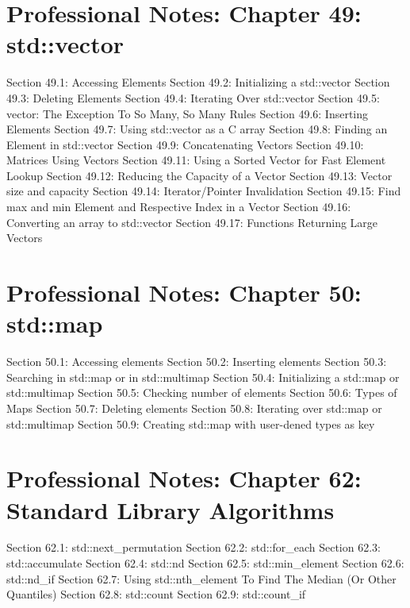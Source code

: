 \hypertarget{professional-notes-chapter-49-stdvector}{%
\section{Professional Notes: Chapter 49:
std::vector}\label{professional-notes-chapter-49-stdvector}}

Section 49.1: Accessing Elements Section 49.2: Initializing a
std::vector Section 49.3: Deleting Elements Section 49.4: Iterating Over
std::vector Section 49.5: vector: The Exception To So Many, So Many
Rules Section 49.6: Inserting Elements Section 49.7: Using std::vector
as a C array Section 49.8: Finding an Element in std::vector Section
49.9: Concatenating Vectors Section 49.10: Matrices Using Vectors
Section 49.11: Using a Sorted Vector for Fast Element Lookup Section
49.12: Reducing the Capacity of a Vector Section 49.13: Vector size and
capacity Section 49.14: Iterator/Pointer Invalidation Section 49.15:
Find max and min Element and Respective Index in a Vector Section 49.16:
Converting an array to std::vector Section 49.17: Functions Returning
Large Vectors

\hypertarget{professional-notes-chapter-50-stdmap}{%
\section{Professional Notes: Chapter 50:
std::map}\label{professional-notes-chapter-50-stdmap}}

Section 50.1: Accessing elements Section 50.2: Inserting elements
Section 50.3: Searching in std::map or in std::multimap Section 50.4:
Initializing a std::map or std::multimap Section 50.5: Checking number
of elements Section 50.6: Types of Maps Section 50.7: Deleting elements
Section 50.8: Iterating over std::map or std::multimap Section 50.9:
Creating std::map with user-dened types as key

\hypertarget{professional-notes-chapter-62-standard-library-algorithms}{%
\section{Professional Notes: Chapter 62: Standard Library
Algorithms}\label{professional-notes-chapter-62-standard-library-algorithms}}

Section 62.1: std::next\_permutation Section 62.2: std::for\_each
Section 62.3: std::accumulate Section 62.4: std::nd Section 62.5:
std::min\_element Section 62.6: std::nd\_if Section 62.7: Using
std::nth\_element To Find The Median (Or Other Quantiles) Section 62.8:
std::count Section 62.9: std::count\_if

